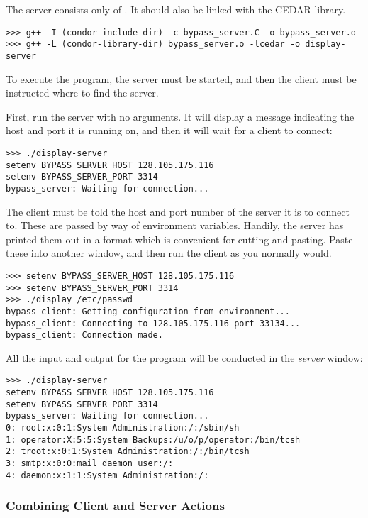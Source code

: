 The server consists only of .  It should also be linked with the CEDAR library.

\begin{verbatim}
>>> g++ -I (condor-include-dir) -c bypass_server.C -o bypass_server.o
>>> g++ -L (condor-library-dir) bypass_server.o -lcedar -o display-server
\end{verbatim}

To execute the program, the server must be started, and then the client must be instructed where to find the server.

First, run the server with no arguments.  It will display a message indicating
the host and port it is running on, and then it will wait for a client
to connect:

\begin{verbatim}
>>> ./display-server
setenv BYPASS_SERVER_HOST 128.105.175.116
setenv BYPASS_SERVER_PORT 3314
bypass_server: Waiting for connection...
\end{verbatim}

The client must be told the host and port number of the server it is
to connect to.  These are passed by way of environment variables.
Handily, the server has printed them out in a format which is convenient
for cutting and pasting.  Paste these into another window, and then
run the client as you normally would.

\begin{verbatim}
>>> setenv BYPASS_SERVER_HOST 128.105.175.116
>>> setenv BYPASS_SERVER_PORT 3314
>>> ./display /etc/passwd
bypass_client: Getting configuration from environment...
bypass_client: Connecting to 128.105.175.116 port 33134...
bypass_client: Connection made.
\end{verbatim}

All the input and output for the program will be conducted in the {\em server} window:

\begin{verbatim}
>>> ./display-server
setenv BYPASS_SERVER_HOST 128.105.175.116
setenv BYPASS_SERVER_PORT 3314
bypass_server: Waiting for connection...
0: root:x:0:1:System Administration:/:/sbin/sh
1: operator:X:5:5:System Backups:/u/o/p/operator:/bin/tcsh
2: troot:x:0:1:System Administration:/:/bin/tcsh
3: smtp:x:0:0:mail daemon user:/:
4: daemon:x:1:1:System Administration:/:
\end{verbatim}

\subsubsection{Combining Client and Server Actions}


